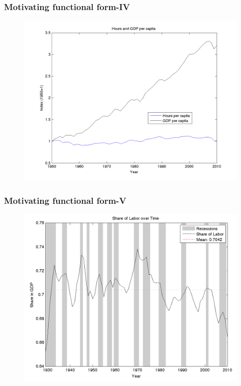\documentclass{beamer}
\begin{document}
\begin{frame}
\frametitle[alignment=center]{Motivating functional form-IV}
\begin{figure}
\centering
\includegraphics[scale=0.25]{HoursandGDP}
\end{figure}
\end{frame}

\begin{frame}
\frametitle[alignment=center]{Motivating functional form-V}
\begin{figure}
\centering
\includegraphics[scale=0.25]{LaborShare}
\end{figure}
\end{frame}
\end{document}
